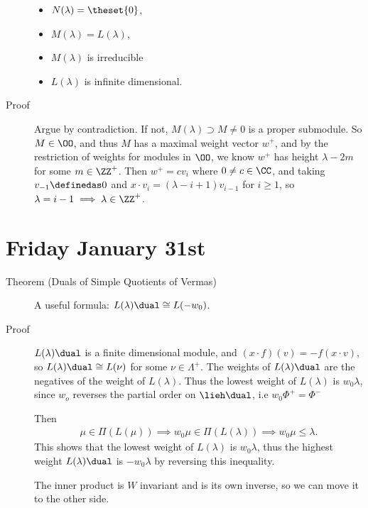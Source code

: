 \begin{description}
\begin{itemize}
\tightlist
\item
  \(N(\lambda) = \theset{0}\),
\item
  \(M(\lambda) = L(\lambda)\),
\item
  \(M(\lambda)\) is irreducible
\item
  \(L(\lambda)\) is infinite dimensional.
\end{itemize}
\item[Proof]
Argue by contradiction. If not, \(M(\lambda) \supset M \neq 0\) is a
proper submodule. So \(M\in \OO\), and thus \(M\) has a maximal weight
vector \(w^+\), and by the restriction of weights for modules in
\(\OO\), we know \(w^+\) has height \(\lambda - 2m\) for some
\(m\in \ZZ^+\). Then \(w^+ = c v_i\) where \(0\neq c \in \CC\), and
taking \(v_{-1} \definedas 0\) and
\(x\cdot v_i = (\lambda - i + 1)v_{i-1}\) for \(i\geq 1\), so
\(\lambda = i-1 \implies \lambda \in \ZZ^+\).
\end{description}

\hypertarget{friday-january-31st}{%
\section{Friday January 31st}\label{friday-january-31st}}

\begin{description}
\item[Theorem (Duals of Simple Quotients of Vermas)]
A useful formula: \(L(\lambda)\dual \cong L(-w_0)\).
\item[Proof]
\(L(\lambda)\dual\) is a finite dimensional module, and
\((x\cdot f)(v) = -f(x\cdot v)\), so \(L(\lambda)\dual \cong L(\nu)\)
for some \(\nu \in \Lambda^+\). The weights of \(L(\lambda)\dual\) are
the negatives of the weight of \(L(\lambda)\). Thus the lowest weight of
\(L(\lambda)\) is \(w_0\lambda\), since \(w_o\) reverses the partial
order on \(\lieh\dual\), i.e \(w_0 \Phi^+ = \Phi^-\)

Then
\begin{align*}
\mu \in \Pi(L(\mu)) \implies w_0 \mu \in \Pi(L(\lambda)) \implies w_0\mu \leq \lambda
.\end{align*} This shows that the lowest weight of \(L(\lambda)\) is
\(w_0 \lambda\), thus the highest weight \(L(\lambda)\dual\) is
\(-w_0 \lambda\) by reversing this inequality.

The inner product is \(W\) invariant and is its own inverse, so we can
move it to the other side.
\end{description}

